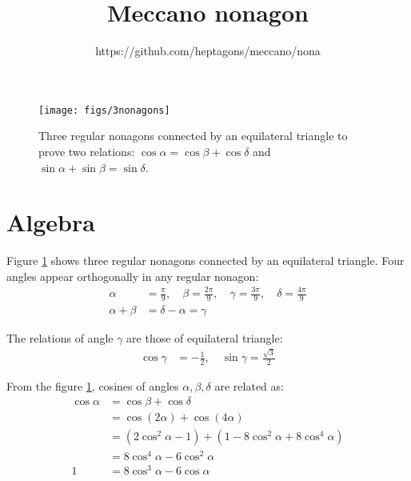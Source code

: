 \documentclass[11pt]{article}
\title{\textbf{Meccano nonagon}}
\author{https://github.com/heptagons/meccano/nona}
\date{}
\begin{document}
\maketitle

\begin{figure}[h]
\centering
\texttt{[image: figs/3nonagons]}
\caption{Three regular nonagons connected by an equilateral triangle to prove two relations:
$\cos\alpha=\cos\beta+\cos\delta$ and $\sin\alpha+\sin\beta=\sin\delta$.}
\label{fig:nonagons}
\end{figure}

\section{Algebra}

Figure \ref{fig:nonagons} shows three regular nonagons connected by an equilateral 
triangle. Four angles appear orthogonally in any regular nonagon:
\begin{align}
\alpha &= \frac{\pi}{9}, \quad \beta = \frac{2\pi}{9}, 
 \quad \gamma = \frac{3\pi}{9}, \quad \delta = \frac{4\pi}{9} \\
\alpha + \beta &= \delta - \alpha = \gamma
\end{align}

The relations of angle $\gamma$ are those of equilateral triangle:
\begin{align}
\cos\gamma &= -\frac{1}{2}, \quad \sin\gamma = \frac{\sqrt{3}}{2}
\end{align}

From the figure \ref{fig:nonagons}, cosines of angles $\alpha, \beta, \delta$ are related as:
\begin{align}
\cos\alpha &= \cos\beta + \cos\delta \label{eq:cosines-alpha-beta-delta-sum} \\
 &= \cos(2\alpha) + \cos(4\alpha) \nonumber\\
 &= (2\cos^2\alpha - 1) + (1 -8\cos^2\alpha + 8\cos^4\alpha) \nonumber\\
 &= 8\cos^4\alpha - 6\cos^2\alpha \nonumber\\
 1 &= 8\cos^3\alpha - 6\cos\alpha
\end{align}
\end{document}
